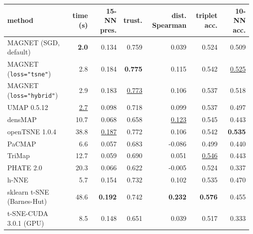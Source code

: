 \begin{tabular}{lrrrrrr}
\toprule
method & time (s) & 15-NN pres. & trust. & dist. Spearman & triplet acc. & 10-NN acc. \\
\midrule
MAGNET (SGD, default) & \textbf{2.0} & 0.134 & 0.759 & 0.039 & 0.524 & 0.509 \\
MAGNET (\texttt{loss="tsne"}) & 2.8 & 0.184 & \textbf{0.775} & 0.115 & 0.542 & \underline{0.525} \\
MAGNET (\texttt{loss="hybrid"}) & 2.9 & 0.183 & \underline{0.773} & 0.106 & 0.537 & 0.518 \\
UMAP 0.5.12 & \underline{2.7} & 0.098 & 0.718 & 0.099 & 0.537 & 0.497 \\
densMAP  & 10.7 & 0.068 & 0.658 & \underline{0.123} & 0.545 & 0.443 \\
openTSNE 1.0.4 & 38.8 & \underline{0.187} & 0.772 & 0.106 & 0.542 & \textbf{0.535} \\
PaCMAP & 6.6 & 0.057 & 0.683 & -0.086 & 0.499 & 0.440 \\
TriMap & 12.7 & 0.059 & 0.690 & 0.051 & \underline{0.546} & 0.443 \\
PHATE 2.0 & 20.3 & 0.066 & 0.622 & -0.005 & 0.524 & 0.337 \\
h-NNE & 5.7 & 0.154 & 0.732 & 0.102 & 0.535 & 0.470 \\
sklearn t-SNE (Barnes-Hut) & 48.6 & \textbf{0.192} & 0.742 & \textbf{0.232} & \textbf{0.576} & 0.455 \\
t-SNE-CUDA 3.0.1 (GPU) & 8.5 & 0.148 & 0.651 & 0.039 & 0.517 & 0.333 \\
\bottomrule
\end{tabular}
